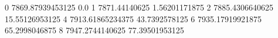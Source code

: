 0 7869.87939453125 0.0
1 7871.44140625 1.56201171875
2 7885.4306640625 15.55126953125
4 7913.61865234375 43.7392578125
6 7935.17919921875 65.2998046875
8 7947.2744140625 77.39501953125
